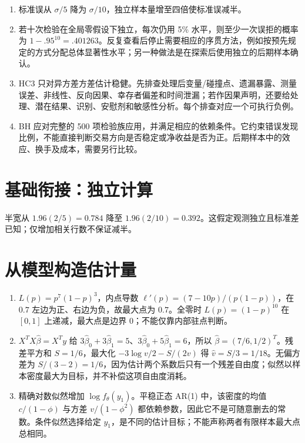\begin{enumerate}[leftmargin=*]
  \item 标准误从 $\sigma/5$ 降为 $\sigma/10$，独立样本量增至四倍使标准误减半。
  \item 若十次检验在全局零假设下独立，每次仍用 5\% 水平，则至少一次误拒的概率为 $1-.95^{10}=.401263$。反复查看后停止需要相应的序贯方法，例如按预先规定的方式分配总体显著性水平；另一种做法是在探索后使用独立的后期样本确认。
  \item HC3 只对异方差方差估计稳健。先排查处理后变量/碰撞点、遗漏暴露、测量误差、非线性、反向因果、幸存者偏差和时间泄漏；若作因果声明，还要给处理、潜在结果、识别、安慰剂和敏感性分析。每个排查对应一个可执行负例。
  \item BH 应对完整的 500 项检验族应用，并满足相应的依赖条件。它约束错误发现比例，不能直接判断交易方向是否稳定或净收益是否为正。后期样本中的效应、换手及成本，需要另行比较。
\end{enumerate}

\section*{基础衔接：独立计算}
半宽从 $1.96(2/5)=0.784$ 降至 $1.96(2/10)=0.392$。这假定观测独立且标准差已知；仅增加相关行数不保证减半。

\section*{从模型构造估计量}
\begin{enumerate}[leftmargin=*]
\item $L(p)=p^7(1-p)^3$，内点导数 $\ell'(p)=(7-10p)/(p(1-p))$，在 $0.7$ 左边为正、右边为负，故最大点为 $0.7$。全零时 $L(p)=(1-p)^{10}$ 在 $[0,1]$ 上递减，最大点是边界 0；不能仅靠内部驻点判断。
\item $X^TX\hat\beta=X^Ty$ 给 $3\hat\beta_0+3\hat\beta_1=5$、$3\hat\beta_0+5\hat\beta_1=6$，所以 $\hat\beta=(7/6,1/2)^T$。残差平方和 $S=1/6$，最大化 $-3\log v/2-S/(2v)$ 得 $\hat v=S/3=1/18$。无偏方差为 $S/(3-2)=1/6$，因为估计两个系数后只有一个残差自由度；似然以样本密度最大为目标，并不补偿这项自由度消耗。
\item 精确对数似然增加 $\log f_\theta(y_1)$。平稳正态 AR(1) 中，该密度的均值 $c/(1-\phi)$ 与方差 $v/(1-\phi^2)$ 都依赖参数，因此它不是可随意删去的常数。条件似然选择给定 $y_1$，是不同的估计目标；不能声称两者有限样本最大点总相同。
\end{enumerate}
